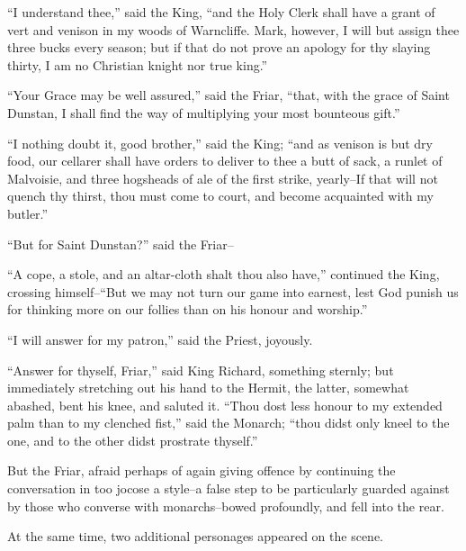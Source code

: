 ``I understand thee,'' said the King, ``and the Holy Clerk shall have a
grant of vert and venison in my woods of Warncliffe. Mark, however, I
will but assign thee three bucks every season; but if that do not prove
an apology for thy slaying thirty, I am no Christian knight nor true
king.''

``Your Grace may be well assured,'' said the Friar, ``that, with the
grace of Saint Dunstan, I shall find the way of multiplying your most
bounteous gift.''

``I nothing doubt it, good brother,'' said the King; ``and as venison is
but dry food, our cellarer shall have orders to deliver to thee a butt
of sack, a runlet of Malvoisie, and three hogsheads of ale of the first
strike, yearly--If that will not quench thy thirst, thou must come to
court, and become acquainted with my butler.''

``But for Saint Dunstan?'' said the Friar--

``A cope, a stole, and an altar-cloth shalt thou also have,'' continued
the King, crossing himself--``But we may not turn our game into earnest,
lest God punish us for thinking more on our follies than on his honour
and worship.''

``I will answer for my patron,'' said the Priest, joyously.

``Answer for thyself, Friar,'' said King Richard, something sternly; but
immediately stretching out his hand to the Hermit, the latter, somewhat
abashed, bent his knee, and saluted it. ``Thou dost less honour to my
extended palm than to my clenched fist,'' said the Monarch; ``thou didst
only kneel to the one, and to the other didst prostrate thyself.''

But the Friar, afraid perhaps of again giving offence by continuing the
conversation in too jocose a style--a false step to be particularly
guarded against by those who converse with monarchs--bowed profoundly,
and fell into the rear.

At the same time, two additional personages appeared on the scene.
